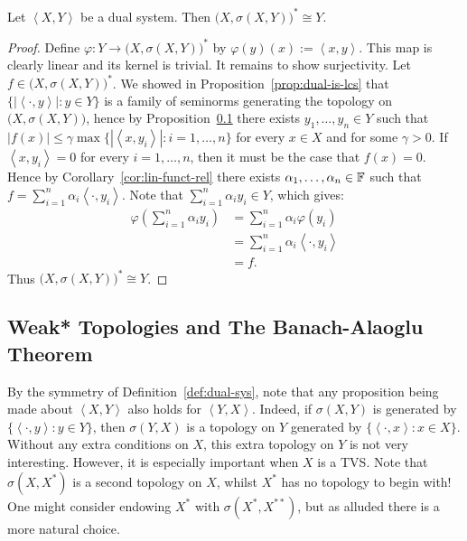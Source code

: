 \begin{theorem}\label{thm:dual-isom}
	Let $\left<X,Y \right>$ be a dual system. Then $\bigl( X,\sigma(X,Y) \bigr)^\ast \cong Y$.
\end{theorem}
	\begin{proof}
		Define $\varphi:Y \rightarrow \bigl( X,\sigma(X,Y) \bigr)^\ast$ by $\varphi(y)(x) := \left<x,y \right>$. This map is clearly linear and its kernel is trivial. It remains to show surjectivity. Let $f \in \bigl( X,\sigma(X,Y) \bigr)^\ast$. We showed in Proposition~\ref{prop:dual-is-lcs} that $\{|\left<\cdot,y \right>|:y \in Y\}$ is a family of seminorms generating the topology on $\bigl( X,\sigma(X,Y) \bigr)$, hence by Proposition~\ref{} there exists $y_1,\ldots ,y_n \in Y$ such that $|f(x)| \leq \gamma \max \{|\left<x,y_i \right>| : i = 1,\ldots ,n\}$ for every $x \in X$ and for some $\gamma > 0$. If $\left<x,y_i \right> = 0$ for every $i = 1,\ldots ,n$, then it must be the case that $f(x) = 0$. Hence by Corollary~\ref{cor:lin-funct-rel} there exists $\alpha_1,\ldots ,\alpha_n \in \mathbb{F}$ such that $f = \sum_{i=1}^{n}\alpha_i \left<\cdot,y_i \right>$. Note that $\sum_{i=1}^{n}\alpha_i y_i \in Y$, which gives:
		\begin{align*}
			\varphi \left( \sum_{i=1}^{n} \alpha_i y_i \right) 
			&= \sum_{i=1}^{n} \alpha_i \varphi(y_i) \\
			&= \sum_{i=1}^{n} \alpha_i \left<\cdot,y_i \right> \\
			&= f.
		\end{align*}
		Thus $\bigl( X,\sigma(X,Y) \bigr)^\ast \cong Y$.
	\end{proof}

\subsection{Weak* Topologies and The Banach-Alaoglu Theorem}

\begin{remark}
	By the symmetry of Definition~\ref{def:dual-sys}, note that any proposition being made about $\left<X,Y \right>$ also holds for $\left<Y,X \right>$. Indeed, if $\sigma(X,Y)$ is generated by $\{\left<\cdot,y \right> : y \in Y\}$, then $\sigma(Y,X)$ is a topology on $Y$ generated by $\{\left<\cdot,x \right>: x \in X\}$. Without any extra conditions on $X$, this extra topology on $Y$ is not very interesting. However, it is especially important when $X$ is a TVS. Note that $\sigma(X,X^\ast)$ is a second topology on $X$, whilst $X^\ast$ has no topology to begin with! One might consider endowing $X^\ast$ with $\sigma(X^\ast,X^{\ast\ast})$, but as alluded there is a more natural choice.
\end{remark}

